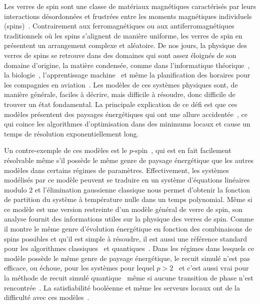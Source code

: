 \begin{comment}
\end{comment}

\Introduction   %

Les verres de spin sont une classe de matériaux magnétiques caractérisés par leurs interactions désordonnées et frustrées entre les moments magnétiques individuels (spins)~\cite{stein2013spin}.
Contrairement aux ferromagnétiques ou aux antiferromagnétiques traditionnels où les spins s'alignent de manière uniforme, les verres de spin en présentent un arrangement complexe et aléatoire.
De nos jours, la physique des verres de spins se retrouve dans des domaines qui sont assez éloignés de son domaine d'origine, la matière condensée, comme dans l'informatique théorique~\cite{kirkpatrick1985configuration}, la biologie~\cite{bryngelson1987spin}, l'apprentissage machine~\cite{venkataraman1991spin} et même la planification des horaires pour les compagnies en aviation~\cite{stein2013spin}.
Les modèles de ces systèmes physiques sont, de manière générale, faciles à décrire, mais difficile à résoudre, donc difficile de trouver un état fondamental.
La principale explication de ce défi est que ces modèles présentent des paysages énergétiques qui ont une allure accidentée~\cite{stein2013spin, qing2009energylandscape}, ce qui coince les algorithmes d'optimisation dans des minimums locaux et cause un temps de résolution exponentiellement long.

Un contre-exemple de ces modèles est le $p$-spin~\cite{mezard_alternative_2002}, qui est en fait facilement résolvable même s'il possède le même genre de paysage énergétique que les autres modèles dans certains régimes de paramètres.
Effectivement, les systèmes modélisés par ce modèle peuvent se traduire en un système d'équations linéaires modulo $2$ et l'élimination gaussienne classique nous permet d'obtenir la fonction de partition du système à température nulle dans un temps polynomial.
Même si ce modèle est une version restreinte d'un modèle général de verre de spin, son analyse fournit des informations utiles sur la physique des verres de spin.
Comme il montre le même genre d'évolution énergétique en fonction des combinaisons de spins possibles et qu'il est simple à résoudre, il est aussi une référence standard pour les algorithmes classiques~\cite{bernaschi2021we, kanao2022simulated, aadit2023all} et quantiques~\cite{jorg2010first, farhi2012performance, hen2019equation, bellitti2021entropic, kowalsky20223, patil_obstacles_2019}.
Dans les régimes dans lesquels ce modèle possède le même genre de paysage énergétique, le recuit simulé n'est pas efficace, ou échoue, pour les systèmes pour lequel $p > 2$~\cite{patil_obstacles_2019, bellitti2021entropic} et c'est aussi vrai pour la méthode de recuit simulé quantique~\cite{farhi2012performance} même si aucune transition de phase n'est rencontrée~\cite{patil_obstacles_2019}.
La satisfiabilité booléenne et même les serveurs locaux ont de la difficulté avec ces modèles~\cite{haanpaa2006hard, jarvisalo2006further,jia2004spin, barthel2002hiding, ricci2001simplest, guidetti2011complexity}.


